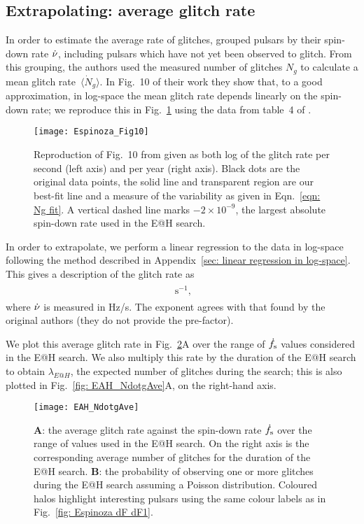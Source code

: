 \documentclass[../full_thesis/full_thesis.tex]{subfiles}
\newcommand{\thisdir}{../glitches_in_CGW}
\begin{document}
\subsection{Extrapolating: average glitch rate}
\label{sec: average glitch frequency}
In order to estimate the average rate of glitches, \citet{Espinoza2011}
grouped pulsars by their spin-down rate $\dot{\nu}$, including pulsars
which have not yet been observed to glitch. From this grouping, the authors
used the measured number of glitches $N_{g}$ to calculate a mean
glitch rate~$\langle \dot{N}_{g}\rangle$. In Fig.~10 of their work they
show that, to a good approximation, in log-space the mean glitch rate depends linearly on the spin-down rate;
we reproduce this in Fig.~\ref{fig: Espinoza 10} using the data from table~4
of \citet{Espinoza2011}.
\begin{figure}[htb]
\centering
\texttt{[image: Espinoza\_Fig10]}
\caption{Reproduction of Fig.~10 from \citet{Espinoza2011} given as both log of
the glitch rate per second (left axis) and per year (right axis). Black
dots are the original data points, the solid line and transparent region are
our best-fit line and a measure of the variability as given in Eqn.~\eqref{eqn:
Ng fit}. A vertical dashed line marks $-2\times10^{-9}$, the largest absolute
spin-down rate used in the E@H search.}
\label{fig: Espinoza 10}
\end{figure}

In order to extrapolate, we perform a linear regression to the data in
log-space following the method described in Appendix~\ref{sec: linear
regression in log-space}.  This gives a description of the glitch rate as
\begin{align}
\begin{split}

\textrm{ s}^{-1},
\end{split}
\label{eqn: Ng fit}
\end{align}
where $\dot{\nu}$ is measured in Hz/s.  The exponent agrees with that found by
the original authors (they do not provide the pre-factor).

We plot this average glitch rate in Fig.~\ref{fig: EAH_NdotgAve}A over the
range of $\dot{f}_{\textrm{s}}$ values considered in the E@H search. We also multiply this
rate by the duration of the E@H search to obtain $\lambda_{E@H}$, the expected
number of glitches during the search; this is also plotted in Fig.~\ref{fig:
EAH_NdotgAve}A, on the right-hand axis.

\begin{figure}[htb]
\centering
\texttt{[image: EAH\_NdotgAve]}
\caption{\textbf{A}: the average glitch rate against the spin-down rate $\dot{f}_{\textrm{s}}$ over the
         range of values used in the E@H search. On the right axis is the corresponding
         average number of glitches for the duration of the E@H search. \textbf{B}: the
         probability of observing one or more glitches during the E@H search
         assuming a Poisson distribution. Coloured halos highlight interesting
         pulsars using the same colour labels as in
         Fig.~\ref{fig: Espinoza dF dF1}.}
\label{fig: EAH_NdotgAve}
\end{figure}
\end{document}
